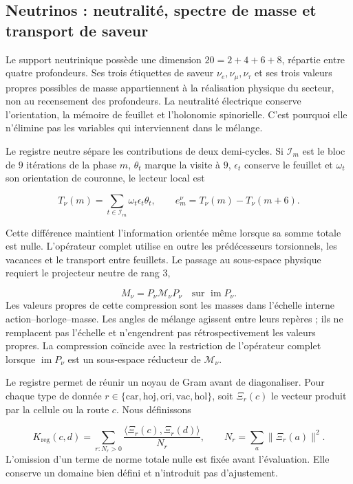 \subsection{Neutrinos : neutralité, spectre de masse et transport de saveur
}
\label{vi:subsec:neutrinos-familias}

Le support neutrinique possède une dimension \(20=2+4+6+8\), répartie entre
quatre profondeurs. Ses trois étiquettes de saveur
\(\nu_e,\nu_\mu,\nu_\tau\) et ses trois valeurs propres possibles de masse
appartiennent à la réalisation physique du secteur, non au recensement des
profondeurs. La neutralité électrique conserve l’orientation, la
mémoire de feuillet et l’holonomie spinorielle. C’est pourquoi elle n’élimine pas les
variables qui interviennent dans le mélange.


Le registre neutre sépare les contributions de deux demi-cycles. Si
\(\mathcal I_m\) est le bloc de \(9\) itérations de la phase \(m\),
\(\theta_t\) marque la visite à \(9\), \(\epsilon_t\) conserve le feuillet
et \(\omega_t\) son orientation de couronne, le lecteur local est

\[
 T_\nu(m)=\sum_{t\in\mathcal I_m}\omega_t\epsilon_t\theta_t,
 \qquad e_m^\nu=T_\nu(m)-T_\nu(m+6).
\]


Cette différence maintient l’information orientée même lorsque sa somme
totale est nulle. L’opérateur complet utilise en outre les prédécesseurs
torsionnels, les vacances et le transport entre feuillets. Le passage au
sous-espace physique requiert le projecteur neutre de rang \(3\),

\[
 M_\nu=P_\nu\mathcal M_\nu P_\nu
 \quad\text{sur }\operatorname{im}P_\nu.
\]
Les valeurs propres de cette compression sont les masses dans l’échelle interne
action--horloge--masse. Les angles de mélange agissent entre leurs repères ;
ils ne remplacent pas l’échelle et n’engendrent pas rétrospectivement les valeurs propres.
La compression coïncide avec la restriction de l’opérateur complet lorsque
\(\operatorname{im}P_\nu\) est un sous-espace réducteur de
\(\mathcal M_\nu\).


Le registre permet de réunir un noyau de Gram avant de diagonaliser.
Pour chaque type de donnée
\(r\in\{\mathrm{car},\mathrm{hoj},\mathrm{ori},\mathrm{vac},\mathrm{hol}\}\),
soit \(\Xi_r(c)\) le vecteur produit par la cellule ou la route \(c\).
Nous définissons

\begin{equation}
 K_{\mathrm{reg}}(c,d)=
 \sum_{r:N_r>0}\frac{\langle\Xi_r(c),\Xi_r(d)\rangle}{N_r},
 \qquad N_r=\sum_a\|\Xi_r(a)\|^2.
 \label{vi:eq:gram-neutrinos}
\end{equation}
L’omission d’un terme de norme totale nulle est fixée avant
l’évaluation. Elle conserve un domaine bien défini et n’introduit pas d’ajustement.


